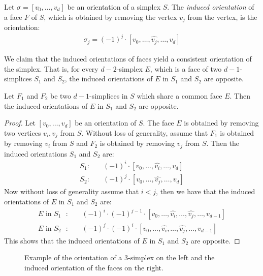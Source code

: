 \begin{definition}
	Let $\sigma = [v_0, \dots, v_{d}]$ be an orientation of a simplex $S$. The \emph{induced orientation} of a face $F$ of $S$, which is obtained by removing the vertex $v_j$ from the vertex, is the orientation:
	\begin{align*}
		\sigma_j = (-1)^j \cdot [v_0, \dots, \hat{v_j}, \dots, v_{d}]
	\end{align*}
\end{definition}

We claim that the induced orientations of faces yield a consistent orientation of the simplex. That is, for every $d-2$-simplex $E$, which is a face of two $d-1$-simplices $S_1$ and $S_2$, the induced orientations of $E$ in $S_1$ and $S_2$ are opposite.

\begin{claim}
	\label{claim:opposite_orientations}
	Let $F_1$ and $F_2$ be two $d-1$-simplices in $S$ which share a common face $E$. Then the induced orientations of $E$ in $S_1$ and $S_2$ are opposite.
\end{claim}
\begin{proof}
	Let $[v_0, \dots, v_{d}]$ be an orientation of $S$. The face $E$ is obtained by removing two vertices $v_i, v_j$ from $S$. Without loss of generality, assume that $F_1$ is obtained by removing $v_i$ from $S$ and $F_2$ is obtained by removing $v_j$ from $S$. Then the induced orientations $S_1$ and $S_2$ are:
	\begin{align*}
		S_1: \quad & (-1)^i \cdot [v_0, \dots, \hat{v_i}, \dots, v_{d}] \\
		S_2: \quad & (-1)^j \cdot [v_0, \dots, \hat{v_j}, \dots, v_{d}]
	\end{align*}
	Now without loss of generality assume that $i < j$, then we have that the induced orientations of $E$ in $S_1$ and $S_2$ are:
	\begin{align*}
		\text{$E$ in $S_1$ }: \quad & (-1)^i \cdot (-1)^{j-1} \cdot [v_0, \dots, \hat{v_i}, \dots, \hat{v_j}, \dots, v_{d-1}] \\
		\text{$E$ in $S_2$ }: \quad & (-1)^j \cdot (-1)^i \cdot [v_0, \dots, \hat{v_i}, \dots, \hat{v_j}, \dots, v_{d-1}]
	\end{align*}
	This shows that the induced orientations of $E$ in $S_1$ and $S_2$ are opposite.
\end{proof}

\begin{figure}[ht]
	\centering
	\caption[Orientation of a simplex]{Example of the orientation of a 3-simplex on the left and the induced orientation of the faces on the right.}
	\label{fig:orientation_of_simplex}
\end{figure}

